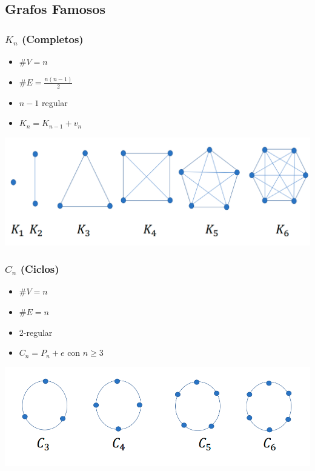 \documentclass{article}
\begin{document}
\subsection{Grafos Famosos}
\subsubsection*{$K_n$ (Completos)}
\begin{minipage}[c]{.45\textwidth}
\begin{itemize}
    \item $\#V = n$
    \item $\#E = \frac{n(n-1)}{2}$
    \item $n-1$ regular
    \item $K_n = K_{n-1} + v_n$
\end{itemize}
\end{minipage}
\begin{minipage}[c]{.45\textwidth}
    \includegraphics[width=\textwidth]{grafos completos.PNG}
\end{minipage}
\subsubsection*{$C_n$ (Ciclos)}
\begin{minipage}[c]{.45\textwidth}
\begin{itemize}
    \item $\#V = n$
    \item $\#E = n$
    \item 2-regular
    \item $C_n = P_n + e$ con $n \geq 3$
\end{itemize}
\end{minipage}
\begin{minipage}[c]{.45\textwidth}
    \includegraphics[width=\textwidth]{grafos ciclos.PNG}
\end{minipage}
\end{document}
